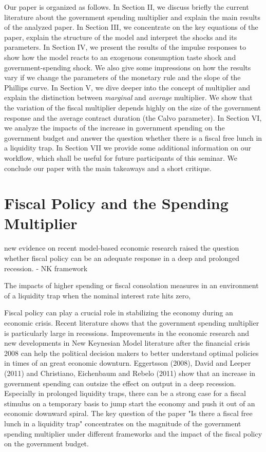 \documentclass[12pt,a4paper,oneside,titlepage]{article}
\begin{document}
Our paper is organized as follows. In Section II, we discuss briefly the current literature about the government spending multiplier and explain the main results of the analyzed paper. In Section III, we concentrate on the key equations of the paper, explain the structure of the model and interpret the shocks and its parameters. In Section IV, we present the results of the impulse responses to show how the model reacts to an exogenous consumption taste shock and government-spending shock. We also give some impressions on how the results vary if we change the parameters of the monetary rule and the slope of the Phillips curve. In Section V, we dive deeper into the concept of multiplier and explain the distinction between \textit{marginal} and \textit{average} multiplier. We show that the variation of the fiscal multiplier depends highly on the size of the government response and the average contract duration (the Calvo parameter). In Section VI, we analyze the impacts of the increase in government spending on the government budget and answer the question whether there is a fiscal free lunch in a liquidity trap. In Section VII we provide some additional information on our workflow, which shall be useful for future participants of this seminar. We conclude our paper with the main takeaways and a short critique.


\section{Fiscal Policy and the Spending Multiplier }

new evidence on recent model-based economic research raised the question whether fiscal policy can be an adequate response in a deep and prolonged recession.
- NK framework

The impacts of higher spending or fiscal consolation measures in an environment of a liquidity trap when the nominal interest rate hits zero,

Fiscal policy can play a crucial role in stabilizing the economy during an economic crisis. Recent literature shows that the government spending multiplier is particularly large in recessions. Improvements in the economic research and new developments in New Keynesian Model literature after the financial crisis 2008 can help the political decision makers to better understand optimal policies in times of an great economic downturn. Eggertsson (2008), David and Leeper (2011) and Christiano, Eichenbaum and Rebelo (2011) show that an increase in government spending can outsize the effect on output in a deep recession. Especially in prolonged liquidity traps, there can be a strong case for a fiscal stimulus on a temporary basis to jump start the economy and push it out of an economic downward spiral.
The key question of the paper "Is there a fiscal free lunch in a liquidity trap" concentrates on the magnitude of the government spending multiplier under different frameworks and the impact of the fiscal policy on the government budget.
\end{document}
